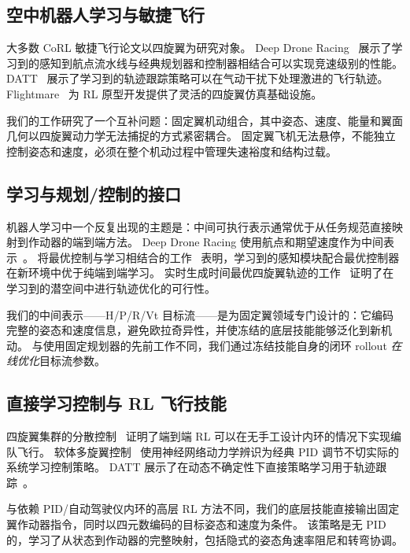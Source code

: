\documentclass{article}
\begin{document}
\subsection{空中机器人学习与敏捷飞行}

大多数 CoRL 敏捷飞行论文以四旋翼为研究对象。
Deep Drone Racing~\citep{kaufmann2023deep} 展示了学习到的感知到航点流水线与经典规划器和控制器相结合可以实现竞速级别的性能。
DATT~\citep{huang2023datt} 展示了学习到的轨迹跟踪策略可以在气动干扰下处理激进的飞行轨迹。
Flightmare~\citep{song2021flightmare} 为 RL 原型开发提供了灵活的四旋翼仿真基础设施。

我们的工作研究了一个互补问题：固定翼机动组合，其中姿态、速度、能量和翼面几何以四旋翼动力学无法捕捉的方式紧密耦合。
固定翼飞机无法悬停，不能独立控制姿态和速度，必须在整个机动过程中管理失速裕度和结构过载。

\subsection{学习与规划/控制的接口}

机器人学习中一个反复出现的主题是：中间可执行表示通常优于从任务规范直接映射到作动器的端到端方法。
Deep Drone Racing 使用航点和期望速度作为中间表示~\citep{kaufmann2023deep}。
将最优控制与学习相结合的工作~\citep{kaufmann2019combining} 表明，学习到的感知模块配合最优控制器在新环境中优于纯端到端学习。
实时生成时间最优四旋翼轨迹的工作~\citep{penicka2022real} 证明了在学习到的潜空间中进行轨迹优化的可行性。

我们的中间表示——H/P/R/Vt 目标流——是为固定翼领域专门设计的：它编码完整的姿态和速度信息，避免欧拉奇异性，并使冻结的底层技能能够泛化到新机动。
与使用固定规划器的先前工作不同，我们通过冻结技能自身的闭环 rollout \emph{在线优化}目标流参数。

\subsection{直接学习控制与 RL 飞行技能}

四旋翼集群的分散控制~\citep{batra2022decentralized} 证明了端到端 RL 可以在无手工设计内环的情况下实现编队飞行。
软体多旋翼控制~\citep{song2021soft} 使用神经网络动力学辨识为经典 PID 调节不切实际的系统学习控制策略。
DATT 展示了在动态不确定性下直接策略学习用于轨迹跟踪~\citep{huang2023datt}。

与依赖 PID/自动驾驶仪内环的高层 RL 方法不同，我们的底层技能直接输出固定翼作动器指令，同时以四元数编码的目标姿态和速度为条件。
该策略是无 PID 的，学习了从状态到作动器的完整映射，包括隐式的姿态角速率阻尼和转弯协调。
\end{document}
